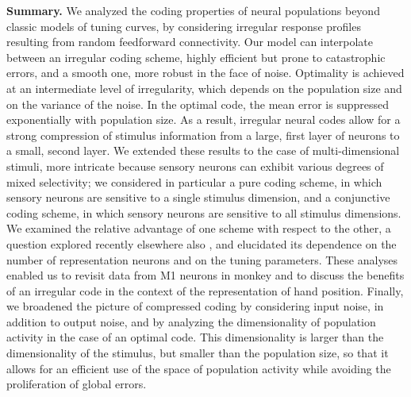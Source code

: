 \documentclass[a4paper]{article}%
\begin{document}
\textbf{Summary.} We analyzed the coding properties of neural populations
beyond classic models of tuning curves, by considering irregular response
profiles resulting from random feedforward connectivity. Our model can
interpolate between an irregular coding scheme, highly efficient but prone to
catastrophic errors, and a smooth one, more robust in the face of noise.
Optimality is achieved at an intermediate level of irregularity, which depends
on the population size and on the variance of the noise. In the optimal code,
the mean error is suppressed exponentially with population size. As a result,
irregular neural codes allow for a strong compression of stimulus information
from a large, first layer of neurons to a small, second layer. We extended
these results to the case of multi-dimensional stimuli, more intricate because
sensory neurons can exhibit various degrees of mixed selectivity; we considered
in particular a pure coding scheme, in which sensory neurons are sensitive to
a single stimulus dimension, and a conjunctive coding scheme, in which sensory
neurons are sensitive to all stimulus dimensions. We examined the relative
advantage of one scheme with respect to the other, a question explored
recently elsewhere also
\cite[]{Finkelstein2018OptimalBats,Harel2020OptimalConstraints}, and elucidated
its dependence on the number of representation neurons and on the tuning
parameters. These analyses enabled us to revisit data from M1 neurons in
monkey \cite[]{Lalazar2016TuningConnectivity} and to discuss the benefits of an
irregular code in the context of the representation of hand position. Finally,
we broadened the picture of compressed coding by considering input noise, in
addition to output noise, and by analyzing the dimensionality of population
activity in the case of an optimal code. This dimensionality is larger than
the dimensionality of the stimulus, but smaller than the population size, so
that it allows for an efficient use of the space of population activity while
avoiding the proliferation of global errors.
\end{document}
